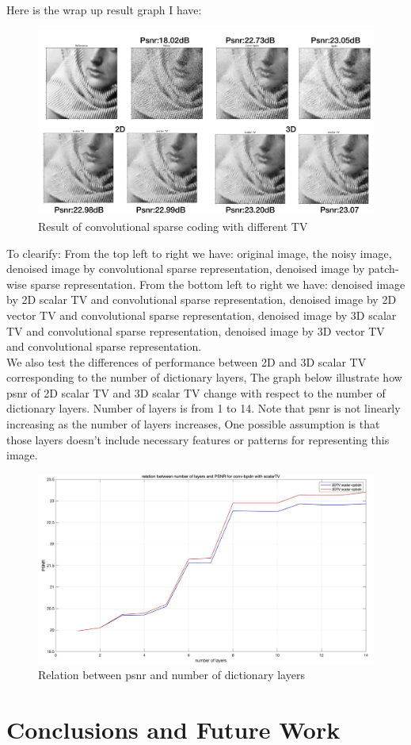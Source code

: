 \documentclass[a4paper,11pt]{article}
\begin{document}
 Here is the wrap up result graph I have:
\begin{figure}[H]
  \includegraphics[width=\linewidth]{8_result.png}
  \caption{Result of convolutional sparse coding with different TV \cite{sporco}}
\end{figure}

To clearify: From the top left to right we have: original image, the noisy image, denoised image by convolutional sparse representation, denoised image by patch-wise sparse representation. From the bottom left to right we have: denoised image by 2D scalar TV and convolutional sparse representation, denoised image by 2D vector TV and convolutional sparse representation, denoised image by 3D scalar TV and convolutional sparse representation, denoised image by 3D vector TV and convolutional sparse representation.\\

We also test the differences of performance between 2D and 3D scalar TV corresponding to the number of dictionary layers, The graph below illustrate how psnr of 2D scalar TV and 3D scalar TV change with respect to the number of dictionary layers. Number of layers is from 1 to 14. Note that psnr is not linearly increasing as the number of layers increases, One possible assumption is that those layers doesn't include necessary features or patterns for representing this image.
\begin{figure}[H]
  \includegraphics[width=\linewidth]{layer_psnr.png}
  \caption{Relation between psnr and number of dictionary layers }
\end{figure}\section{Conclusions and Future Work}~
\end{document}
